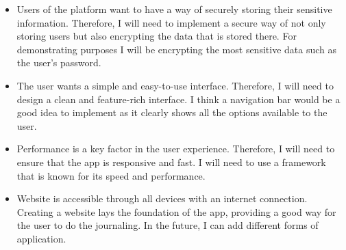 \setcounter{question}{0}
    \begin{itemize}

            \item Users of the platform want to have a way of securely storing their sensitive information. Therefore, I will need to implement a secure way of not only storing users but also encrypting the data that is stored there. For demonstrating purposes I will be encrypting the most sensitive data such as the user's password.
            

            \item The user wants a simple and easy-to-use interface. Therefore, I will need to design a clean and feature-rich interface. I think a navigation bar would be a good idea to implement as it clearly shows all the options available to the user.

            \item Performance is a key factor in the user experience. Therefore, I will need to ensure that the app is responsive and fast. I will need to use a framework that is known for its speed and performance.

            \item Website is accessible through all devices with an internet connection. Creating a website lays the foundation of the app, providing a good way for the user to do the journaling. In the future, I can add different forms of application.


\end{itemize}
